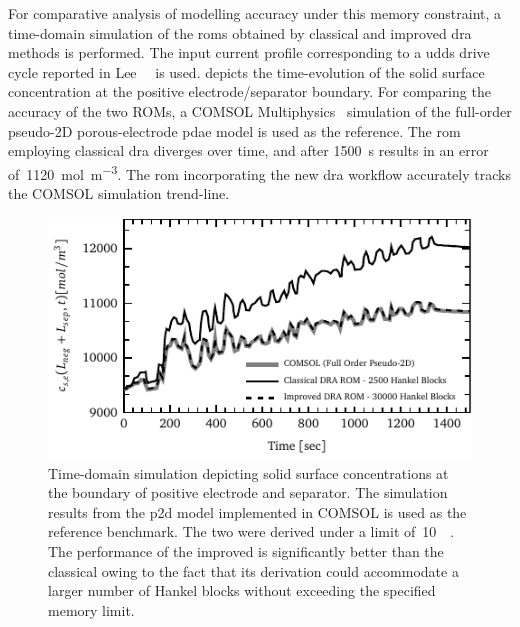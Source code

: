 For comparative analysis  of modelling accuracy under this  memory constraint, a
time-domain simulation  of the  \glspl{rom} obtained  by classical  and improved
\gls{dra}  methods is  performed.  The input  current  profile corresponding  to
a  \gls{udds}  drive  cycle  reported in  Lee~\etal{}~\cite{Lee2012a}  is  used.
  depicts  the  time-evolution of  the  solid  surface
concentration  at  the  positive  electrode/separator  boundary.  For  comparing
the  accuracy   of  the   two  ROMs,  a   COMSOL  Multiphysics~\cite{COMSOL2012}
simulation  of  the  full-order   pseudo-2D  porous-electrode  \gls{pdae}  model
is  used  as   the  reference.  The  \gls{rom}   employing  classical  \gls{dra}
diverges  over   time,  and  after   \SI{1500}{\second}  results  in   an  error
of~\SI{1120}{\mole\per\meter\cubed}.   The  \gls{rom}  incorporating   the  new
\gls{dra}  workflow   accurately  tracks   the  COMSOL   simulation  trend-line.

\begin{figure}[!htbp]
    \centering
    \includegraphics{chapters/dra/figures/comsol_comparison.pdf}
    \caption[%
    Solid surface concentrations at positive electrode/separator interface
    ]%
    {%
        Time-domain  simulation depicting  solid surface  concentrations at  the
        boundary  of positive  electrode and  separator. The  simulation results
        from  the  \gls{p2d}  model  implemented   in  COMSOL  is  used  as  the
        reference  benchmark. The  two    were derived  under
        a    limit   of~\SI{10}{\giga\byte}.  The  performance
        of  the  improved   is  significantly  better than  the
        classical  owing to the  fact that its derivation could
        accommodate  a larger  number  of Hankel  blocks  without exceeding  the
        specified memory limit.
    }%
    \label{fig:time_domain_sim}
\end{figure}

